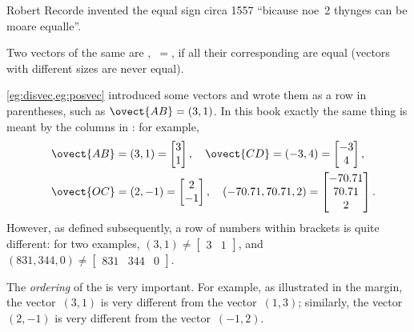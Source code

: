 \begin{definition}
\begin{aside}
Robert Recorde invented the equal sign circa 1557 ``bicause noe~2 thynges can be moare equalle''.  
\end{aside}%
Two vectors of the same  are ,~\(=\), if all their corresponding  are equal (vectors with different sizes are never equal).
\end{definition}

\cref{eg:disvec,eg:posvec} introduced some vectors and wrote them as a row in parentheses, such as \(\ovect{AB}=(3,1)\).
In this book exactly the same thing is meant by the columns in : for example,
\begin{eqnarray*}&&
\ovect{AB}=(3,1)=\begin{bmatrix} 3\\1 \end{bmatrix},\quad
\ovect{CD}=(-3,4)=\begin{bmatrix} -3\\4 \end{bmatrix},\quad
\\&&
\ovect{OC}=(2,-1)=\begin{bmatrix} 2\\-1 \end{bmatrix},\quad
(-70.71,70.71,2)=\begin{bmatrix} -70.71\\70.71\\2 \end{bmatrix}.
\end{eqnarray*}
However, as defined subsequently, a row of numbers within brackets is  quite different: for two examples, \((3,1)\neq\begin{bmatrix} 3&1 \end{bmatrix}\),  and \((831,344,0)\neq\begin{bmatrix} 831&344&0 \end{bmatrix}\).

The \emph{ordering} of the  is very important.
%
For example, as illustrated in the margin, the vector~\((3,1)\) is very different from the vector~\((1,3)\); similarly, the vector~\((2,-1)\) is very different from the vector~\((-1,2)\).
 


